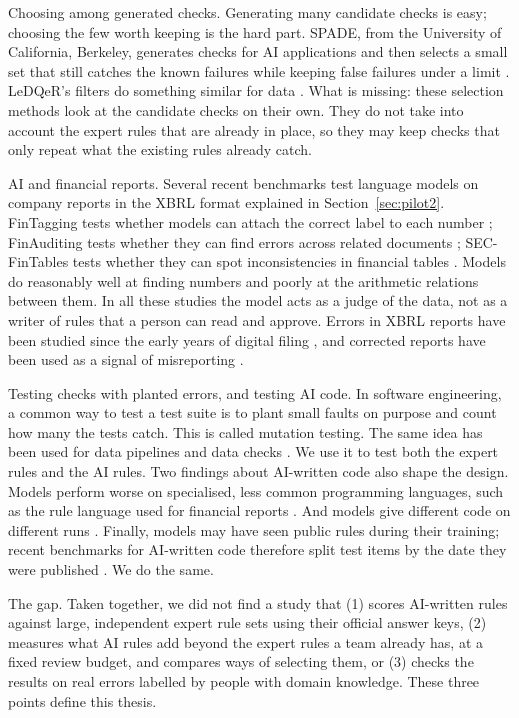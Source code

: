 \documentclass[11pt,a4paper]{article}
\begin{document}
Choosing among generated checks. Generating many candidate checks is easy; choosing the few worth keeping is the hard part. SPADE, from the University of California, Berkeley, generates checks for AI applications and then selects a small set that still catches the known failures while keeping false failures under a limit \cite{spade}. LeDQeR's filters do something similar for data \cite{ledqer}. What is missing: these selection methods look at the candidate checks on their own. They do not take into account the expert rules that are already in place, so they may keep checks that only repeat what the existing rules already catch.

AI and financial reports. Several recent benchmarks test language models on company reports in the XBRL format explained in Section~\ref{sec:pilot2}. FinTagging tests whether models can attach the correct label to each number \cite{fintagging}; FinAuditing tests whether they can find errors across related documents \cite{finauditing}; SEC-FinTables tests whether they can spot inconsistencies in financial tables \cite{secfintables}. Models do reasonably well at finding numbers and poorly at the arithmetic relations between them. In all these studies the model acts as a judge of the data, not as a writer of rules that a person can read and approve. Errors in XBRL reports have been studied since the early years of digital filing \cite{debreceny}, and corrected reports have been used as a signal of misreporting \cite{brown}.

Testing checks with planted errors, and testing AI code. In software engineering, a common way to test a test suite is to plant small faults on purpose and count how many the tests catch. This is called mutation testing. The same idea has been used for data pipelines and data checks \cite{homayouni,jenga}. We use it to test both the expert rules and the AI rules. Two findings about AI-written code also shape the design. Models perform worse on specialised, less common programming languages, such as the rule language used for financial reports \cite{joel}. And models give different code on different runs \cite{ouyang}. Finally, models may have seen public rules during their training; recent benchmarks for AI-written code therefore split test items by the date they were published \cite{livecodebench}. We do the same.

The gap. Taken together, we did not find a study that (1) scores AI-written rules against large, independent expert rule sets using their official answer keys, (2) measures what AI rules add beyond the expert rules a team already has, at a fixed review budget, and compares ways of selecting them, or (3) checks the results on real errors labelled by people with domain knowledge. These three points define this thesis.
\end{document}
